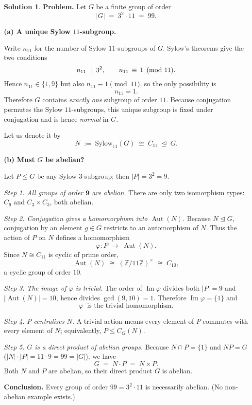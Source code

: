 \documentclass[12pt]{article}
\theoremstyle{definition} %
\newtheorem{solution}{Solution}
\theoremstyle{plain} %
\begin{document}
\begin{solution}
  \textbf{Problem.}\;
  Let \(G\) be a finite group of order
  \[
     |G| \;=\; 3^{2}\cdot 11 \;=\; 99 .
  \]
  
  \medskip
  \textbf{(a) A unique Sylow \(11\)-subgroup.}
  
  Write \(n_{11}\) for the number of Sylow \(11\)-subgroups of \(G\).
  Sylow’s theorems give the two conditions  
  \[
     n_{11}\;\bigm|\;3^{2},
     \qquad
     n_{11}\,\equiv\,1\pmod{11}.
  \]
  Hence \(n_{11}\in\{1,9\}\) but also \(n_{11}\equiv1\pmod{11}\),
  so the only possibility is
  \[
     n_{11}=1.
  \]
  Therefore \(G\) contains \emph{exactly one} subgroup of order \(11\).
  Because conjugation permutes the Sylow \(11\)-subgroups,
  this unique subgroup is fixed under conjugation and is hence
  \emph{normal} in \(G\).
  
  Let us denote it by
  \[
     N \;:=\; \text{Sylow}_{11}(G)
     \;\cong\;C_{11}\;\trianglelefteq\;G.
  \]
  
  \medskip
  \textbf{(b) Must \(G\) be abelian?}
  
  Let \(P\le G\) be any Sylow \(3\)-subgroup; then \(|P|=3^{2}=9\).
  
  \smallskip
  \emph{Step 1.\; All groups of order \(\mathbf{9}\) are abelian.}  
  There are only two isomorphism types:
  \(C_{9}\) and \(C_{3}\times C_{3}\), both abelian.
  
  \smallskip
  \emph{Step 2.\; Conjugation gives a homomorphism into
  \(\operatorname{Aut}(N)\).}  
  Because \(N\trianglelefteq G\), conjugation by an element
  \(g\in G\) restricts to an automorphism of \(N\).
  Thus the action of \(P\) on \(N\) defines a homomorphism
  \[
     \varphi : P \;\longrightarrow\; \operatorname{Aut}(N).
  \]
  Since \(N\cong C_{11}\) is cyclic of prime order,
  \[
     \operatorname{Aut}(N)\;\cong\;(\mathbb Z/11\mathbb Z)^{\times}
     \;\cong\;C_{10},
  \]
  a cyclic group of order \(10\).
  
  \smallskip
  \emph{Step 3.\; The image of \(\varphi\) is trivial.}  
  The order of \(\operatorname{Im}\varphi\) divides both \(|P|=9\)
  and \(|\operatorname{Aut}(N)|=10\), hence divides
  \(\gcd(9,10)=1\).  Therefore \(\operatorname{Im}\varphi=\{1\}\) and
  \[
     \varphi \ \text{ is the trivial homomorphism}.
  \]
  
  \smallskip
  \emph{Step 4.\; \(P\) centralises \(N\).}  
  A trivial action means every element of \(P\) commutes
  with every element of \(N\); equivalently,
  \(P\le C_{G}(N)\).
  
  \smallskip
  \emph{Step 5.\; \(G\) is a direct product of abelian groups.}  
  Because \(N\cap P=\{1\}\) and \(NP=G\)
  (\(|N|\cdot|P|=11\cdot9=99=|G|\)),
  we have
  \[
     G \;=\; N\cdot P \;=\; N \times P .
  \]
  Both \(N\) and \(P\) are abelian,
  so their direct product \(G\) is abelian.
  
  \medskip
  \textbf{Conclusion.}\;
  Every group of order \(99=3^{2}\cdot11\) is necessarily abelian.  
  (No non-abelian example exists.)
  \end{solution}
\end{document}
